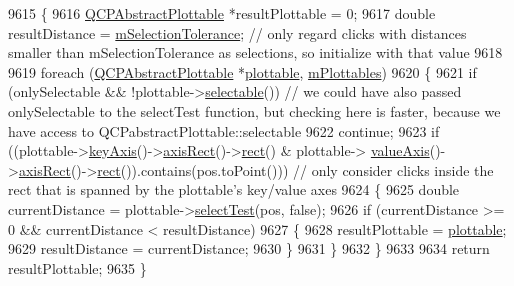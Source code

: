 \begin{DoxyCode}
9615 \{
9616   \hyperlink{class_q_c_p_abstract_plottable}{QCPAbstractPlottable} *resultPlottable = 0;
9617   \textcolor{keywordtype}{double} resultDistance = \hyperlink{class_q_custom_plot_abc36e12dd0482117ad810a800c847722}{mSelectionTolerance}; \textcolor{comment}{// only regard clicks with distances
       smaller than mSelectionTolerance as selections, so initialize with that value}
9618   
9619   \textcolor{keywordflow}{foreach} (\hyperlink{class_q_c_p_abstract_plottable}{QCPAbstractPlottable} *\hyperlink{class_q_custom_plot_adea38bdc660da9412ba69fb939031567}{plottable}, 
      \hyperlink{class_q_custom_plot_a62bf8e4e7f8d23fc1e9301ba0148269f}{mPlottables})
9620   \{
9621     \textcolor{keywordflow}{if} (onlySelectable && !plottable->\hyperlink{class_q_c_p_abstract_plottable_af895574da1ec0d050711b6c9deda296a}{selectable}()) \textcolor{comment}{// we could have also passed onlySelectable
       to the selectTest function, but checking here is faster, because we have access to
       QCPabstractPlottable::selectable}
9622       \textcolor{keywordflow}{continue};
9623     \textcolor{keywordflow}{if} ((plottable->\hyperlink{class_q_c_p_abstract_plottable_a72c7a09c22963f2c943f07112b311103}{keyAxis}()->\hyperlink{class_q_c_p_axis_aada3102af43b029e3879bcbf2bddfabb}{axisRect}()->\hyperlink{class_q_c_p_layout_element_affdfea003469aac3d0fac5f4e06171bc}{rect}() & plottable->
      \hyperlink{class_q_c_p_abstract_plottable_a3106f9d34d330a6097a8ec5905e5b519}{valueAxis}()->\hyperlink{class_q_c_p_axis_aada3102af43b029e3879bcbf2bddfabb}{axisRect}()->\hyperlink{class_q_c_p_layout_element_affdfea003469aac3d0fac5f4e06171bc}{rect}()).contains(pos.toPoint())) \textcolor{comment}{// only consider clicks
       inside the rect that is spanned by the plottable's key/value axes}
9624     \{
9625       \textcolor{keywordtype}{double} currentDistance = plottable->\hyperlink{class_q_c_p_abstract_plottable_a38efe9641d972992a3d44204bc80ec1d}{selectTest}(pos, \textcolor{keyword}{false});
9626       \textcolor{keywordflow}{if} (currentDistance >= 0 && currentDistance < resultDistance)
9627       \{
9628         resultPlottable = \hyperlink{class_q_custom_plot_adea38bdc660da9412ba69fb939031567}{plottable};
9629         resultDistance = currentDistance;
9630       \}
9631     \}
9632   \}
9633   
9634   \textcolor{keywordflow}{return} resultPlottable;
9635 \}
\end{DoxyCode}


